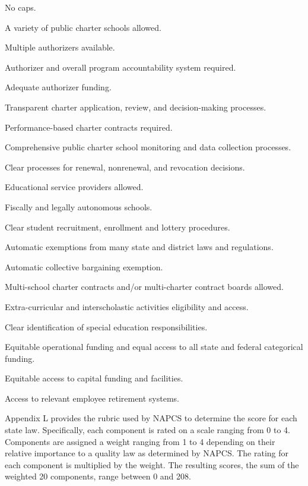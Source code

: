 \documentclass[letterpaper,12p,twoside]{article} %
\renewcommand{\normalsize}{\fontsize{12}{13}\selectfont}
\begin{document}
\begin{singlespace}\normalsize
\begin{enumerate}[noitemsep]
{\it
\item No caps.
\item A variety of public charter schools allowed.
\item Multiple authorizers available.
\item Authorizer and overall program accountability system required.
\item Adequate authorizer funding.
\item Transparent charter application, review, and decision-making processes.
\item Performance-based charter contracts required.
\item Comprehensive public charter school monitoring and data collection processes.
\item Clear processes for renewal, nonrenewal, and revocation decisions.
\item Educational service providers allowed.
\item Fiscally and legally autonomous schools.
\item Clear student recruitment, enrollment and lottery procedures.
\item Automatic exemptions from many state and district laws and regulations.
\item Automatic collective bargaining exemption.
\item Multi-school charter contracts and/or multi-charter contract boards allowed.
\item Extra-curricular and interscholastic activities eligibility and access.
\item Clear identification of special education responsibilities.
\item Equitable operational funding and equal access to all state and federal categorical funding.
\item Equitable access to capital funding and facilities.
\item Access to relevant employee retirement systems.
}
\end{enumerate}
\end{singlespace}

\noindent Appendix L provides the rubric used by NAPCS to determine the score for each state law. Specifically, each component is rated on a scale ranging from 0 to 4. Components are assigned a weight ranging from 1 to 4 depending on their relative importance to a quality law as determined by NAPCS. The rating for each component is multiplied by the weight. The resulting scores, the sum of the weighted 20 components, range between 0 and 208.
\end{document}
